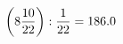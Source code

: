 \documentclass[preview]{standalone}
\begin{document}
\begin{align*}
\left( 8 { 10 \over 22 } \right)  :  { 1 \over 22 } = 186.0
\end{align*}
\end{document}
